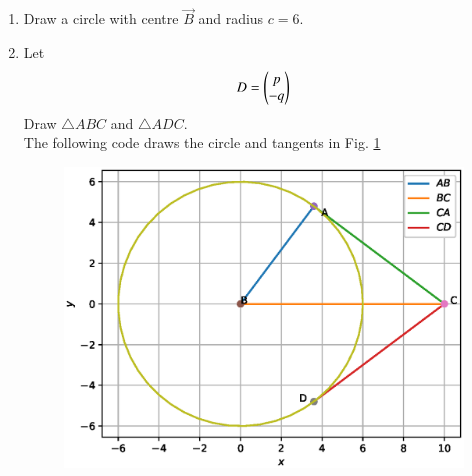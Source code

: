 \documentclass[journal,12pt,twocolumn]{IEEEtran}
\renewcommand\thesection{\arabic{section}}
\begin{document}
\begin{enumerate}[label=\thesection.\arabic*
,ref=\thesection.\theenumi]
\item Draw a circle with centre $\vec{B}$
%
and radius $c = 6$.
\item Let 
\begin{align}
D=\begin{pmatrix}p \\ -q\end{pmatrix}
\end{align}
%
Draw $\triangle ABC$ and $\triangle ADC$.
\\
\solution 
The following code draws the circle and tangents in Fig. \ref{fig:circle}

%
\begin{figure}
\centering
\includegraphics[width=\columnwidth]{./figs/circle.eps}
\caption{}
\label{fig:circle}
\end{figure}
%
\end{enumerate}
\end{document}
